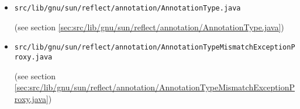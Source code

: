 \documentclass[a4paper, 10pt, titlepage]{scrartcl} %
\begin{document}
\begin{itemize}
 \item \begin{scriptsize}\verb|src|\hspace{0.0pt}\verb|/|\hspace{0.0pt}\verb|lib|\hspace{0.0pt}\verb|/|\hspace{0.0pt}\verb|gnu|\hspace{0.0pt}\verb|/|\hspace{0.0pt}\verb|sun|\hspace{0.0pt}\verb|/|\hspace{0.0pt}\verb|reflect|\hspace{0.0pt}\verb|/|\hspace{0.0pt}\verb|annotation|\hspace{0.0pt}\verb|/|\hspace{0.0pt}\verb|AnnotationType|\hspace{0.0pt}\verb|.|\hspace{0.0pt}\verb|java|\end{scriptsize} (see section \ref{sec:src/lib/gnu/sun/reflect/annotation/AnnotationType.java})
 \item \begin{scriptsize}\verb|src|\hspace{0.0pt}\verb|/|\hspace{0.0pt}\verb|lib|\hspace{0.0pt}\verb|/|\hspace{0.0pt}\verb|gnu|\hspace{0.0pt}\verb|/|\hspace{0.0pt}\verb|sun|\hspace{0.0pt}\verb|/|\hspace{0.0pt}\verb|reflect|\hspace{0.0pt}\verb|/|\hspace{0.0pt}\verb|annotation|\hspace{0.0pt}\verb|/|\hspace{0.0pt}\verb|AnnotationTypeMismatchExceptionProxy|\hspace{0.0pt}\verb|.|\hspace{0.0pt}\verb|java|\end{scriptsize} (see section \ref{sec:src/lib/gnu/sun/reflect/annotation/AnnotationTypeMismatchExceptionProxy.java})

\end{itemize}
\end{document}
